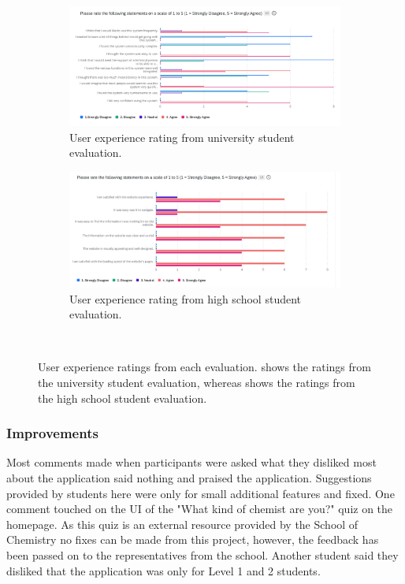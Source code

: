 \documentclass{l4proj}
\begin{document}
\begin{figure}[ht]
    \centering
    \begin{subfigure}[b]{\textwidth}
        \includegraphics[width=\linewidth]{images/uniStudentsExperience.pdf}    
        \caption{User experience rating from university student evaluation.}
        \label{fig:uniExperience} 
    \end{subfigure}
    \centering
    \begin{subfigure}[b]{\textwidth}
        \includegraphics[width=\linewidth]{images/highschoolStudentsExperience.pdf}    
        \caption{User experience rating from high school student evaluation.}
        \label{fig:highschoolExperience} 
    \end{subfigure}
    ~ %
    \caption{User experience ratings from each evaluation.  shows the ratings from the university student evaluation,  whereas  shows the ratings from the high school student evaluation.
    }\label{fig:experience}
\end{figure}

\subsubsection{Improvements}
Most comments made when participants were asked what they disliked most about the application said nothing and praised the application. Suggestions provided by students here were only for small additional features and fixed. One comment touched on the UI of the "What kind of chemist are you?" quiz on the homepage. As this quiz is an external resource provided by the School of Chemistry no fixes can be made from this project,  however,  the feedback has been passed on to the representatives from the school. Another student said they disliked that the application was only for Level 1 and 2 students.
\end{document}
